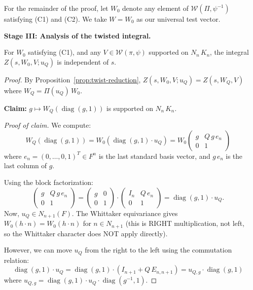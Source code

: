 For the remainder of the proof, let $W_0$ denote any element of
$\mathcal{W}(\Pi, \psi^{-1})$ satisfying (C1) and (C2). We take $W = W_0$
as our universal test vector.

\bigskip
\noindent\textbf{Stage III: Analysis of the twisted integral.}

\begin{theorem}\label{thm:s-indep}
For $W_0$ satisfying (C1), and any $V \in \mathcal{W}(\pi, \psi)$
supported on $N_n\,K_n$, the integral
$Z(s, W_0, V; u_Q)$ is independent of $s$.
\end{theorem}

\begin{proof}
By Proposition~\ref{prop:twist-reduction},
$Z(s, W_0, V; u_Q) = Z(s, W_Q, V)$ where $W_Q = \Pi(u_Q)\,W_0$.

\textbf{Claim:} $g \mapsto W_Q(\operatorname{diag}(g,1))$ is supported on
$N_n\,K_n$.

\textit{Proof of claim.} We compute:
\begin{equation}\label{eq:WQ-eval}
  W_Q(\operatorname{diag}(g,1))
  = W_0(\operatorname{diag}(g,1) \cdot u_Q)
  = W_0\!\begin{pmatrix} g & Q\,g\,e_n \\ 0 & 1 \end{pmatrix}
\end{equation}
where $e_n = (0,\ldots,0,1)^T \in F^n$ is the last standard basis vector,
and $g\,e_n$ is the last column of $g$.

Using the block factorization:
\begin{equation}\label{eq:block-factor}
  \begin{pmatrix} g & Q\,g\,e_n \\ 0 & 1 \end{pmatrix}
  = \begin{pmatrix} g & 0 \\ 0 & 1 \end{pmatrix}
  \cdot \begin{pmatrix} I_n & Q\,e_n \\ 0 & 1 \end{pmatrix}
  = \operatorname{diag}(g,1) \cdot u_Q.
\end{equation}
Now, $u_Q \in N_{n+1}(F)$. The Whittaker equivariance gives
$W_0(h \cdot n) = W_0(h \cdot n)$ for $n \in N_{n+1}$ (this is RIGHT multiplication,
not left, so the Whittaker character does NOT apply directly).

However, we can move $u_Q$ from the right to the left using the commutation
relation:
\begin{equation}\label{eq:commutation}
  \operatorname{diag}(g,1) \cdot u_Q
  = \operatorname{diag}(g,1) \cdot (I_{n+1} + Q\,E_{n,n+1})
  = u_{Q,g} \cdot \operatorname{diag}(g,1)
\end{equation}
where $u_{Q,g} = \operatorname{diag}(g,1) \cdot u_Q \cdot \operatorname{diag}(g^{-1},1)$.


\end{proof}
